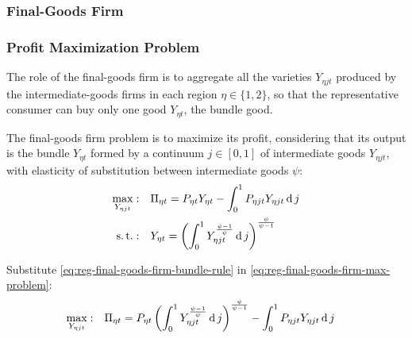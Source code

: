 \documentclass[
thesis.tex
]{subfiles}
\begin{document}

\subsubsection{Final-Goods Firm}

\subsubsection*{Profit Maximization Problem}

The role of the final-goods firm is to aggregate all the varieties $Y_{\eta jt}$ produced by the intermediate-goods firms in each region $\eta \in \{1,2\}$, so that the representative consumer can buy only one good $Y_{\eta t}$, the bundle good.



The final-goods firm problem is to maximize its profit, considering that its output is the bundle $Y_{\eta t}$ formed by a continuum $j \in [0,1]$ of intermediate goods $Y_{\eta jt}$, with elasticity of substitution between intermediate goods $\psi$:
\begin{align}
	\max_{Y_{\eta jt}}: &\quad \Pi_{\eta t} = P_{\eta t} Y_{\eta t} - \int_{0}^{1} P_{\eta jt} Y_{\eta jt} \operatorname{d} j \label{eq:reg-final-goods-firm-max-problem} \\
	\operatorname{s.t.}: & \quad Y_{\eta t} = \left( \int_{0}^{1} Y_{\eta jt}^{\frac{\psi-1}{\psi}} \operatorname{d} j \right)^{\frac{\psi}{\psi-1}} \label{eq:reg-final-goods-firm-bundle-rule}
\end{align}

Substitute \ref{eq:reg-final-goods-firm-bundle-rule} in \ref{eq:reg-final-goods-firm-max-problem}:
\begin{align}
	\label{eq:reg-final-goods-firm-max-problem-2}
	\max_{Y_{\eta jt}}: & \quad \Pi_{\eta t} = P_{\eta t} \left( \int_{0}^{1} Y_{\eta jt}^{\frac{\psi-1}{\psi}} \operatorname{d} j \right)^{\frac{\psi}{\psi-1}} - \int_{0}^{1} P_{\eta jt} Y_{\eta jt} \operatorname{d} j
\end{align}
\end{document}
